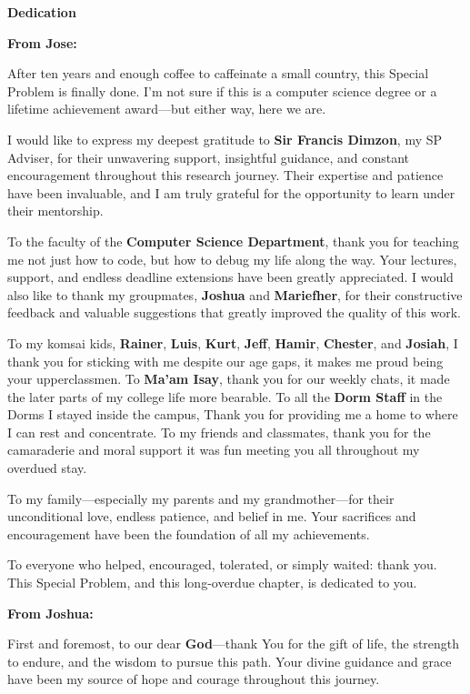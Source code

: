 \begin{center}
	\textbf{Dedication}
\end{center}

\textbf{From Jose:}

After ten years and enough coffee to caffeinate a small country, this Special Problem is finally done. I’m not sure if this is a computer science degree or a lifetime achievement award—but either way, here we are.

I would like to express my deepest gratitude to \textbf{Sir Francis Dimzon}, my SP Adviser, for their unwavering support, insightful guidance, and constant encouragement throughout this research journey. Their expertise and patience have been invaluable, and I am truly grateful for the opportunity to learn under their mentorship.

To the faculty of the \textbf{Computer Science Department}, thank you for teaching me not just how to code, but how to debug my life along the way. Your lectures, support, and endless deadline extensions have been greatly appreciated. I would also like to thank my groupmates, \textbf{Joshua} and \textbf{Mariefher}, for their constructive feedback and valuable suggestions that greatly improved the quality of this work.

To my komsai kids, \textbf{Rainer}, \textbf{Luis}, \textbf{Kurt}, \textbf{Jeff}, \textbf{Hamir}, \textbf{Chester}, and \textbf{Josiah}, I thank you for sticking with me despite our age gaps, it makes me proud being your upperclassmen. To \textbf{Ma'am Isay}, thank you for our weekly chats, it made the later parts of my college life more bearable. To all the \textbf{Dorm Staff} in the Dorms I stayed inside the campus, Thank you for providing me a home to where I can rest and concentrate. To my friends and classmates, thank you for the camaraderie and moral support it was fun meeting you all throughout my overdued stay.

To my family—especially my parents and my grandmother—for their unconditional love, endless patience, and belief in me. Your sacrifices and encouragement have been the foundation of all my achievements.

To everyone who helped, encouraged, tolerated, or simply waited: thank you. This Special Problem, and this long-overdue chapter, is dedicated to you.

\newpage


\textbf{From Joshua:}

First and foremost, to our dear \textbf{God}—thank You for the gift of life, the strength to endure, and the wisdom to pursue this path. Your divine guidance and grace have been my source of hope and courage throughout this journey.

